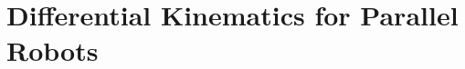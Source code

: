 \documentclass[robotics,article,accept,moreauthors,pdftex]{Definitions/mdpi}
\begin{document}
\section{Differential Kinematics for Parallel Robots}
\label{sec:ZB_Anwendung}

\end{document}
